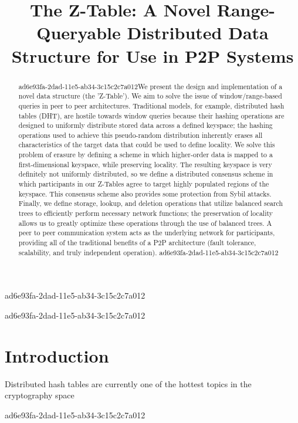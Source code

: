 \documentclass[12pt]{article}
\title{The Z-Table: A Novel Range-Queryable Distributed Data Structure for Use in P2P Systems}
\begin{document}
ad6e93fa-2dad-11e5-ab34-3c15c2c7a012
\maketitle

\begin{abstract}
ad6e93fa-2dad-11e5-ab34-3c15c2c7a012We present the design and implementation of a novel data structure (the 'Z-Table'). We aim to solve the issue of window/range-based queries in peer to peer architectures. Traditional models, for example,  distributed hash tables (DHT), are hostile towards window queries because their hashing operations are designed to uniformly distribute stored data across a defined keyspace; the hashing operations used to achieve this pseudo-random distribution inherently erases all characteristics of the target data that could be used to define locality. We solve this problem of erasure by defining a scheme in which higher-order data is mapped to a first-dimensional keyspace, while preserving locality. The resulting keyspace is very definitely not uniformly distributed, so we define a distributed consensus scheme in which participants in our Z-Tables agree to target highly populated regions of the keyspace. This consensus scheme also provides some protection from Sybil attacks. Finally, we define storage, lookup, and deletion operations that utilize balanced search trees to efficiently perform necessary network functions; the preservation of locality allows us to greatly optimize these operations through the use of balanced trees. A peer to peer communication system acts as the underlying network for participants, providing all of the traditional benefits of a P2P architecture (fault tolerance, scalability, and truly independent operation).
ad6e93fa-2dad-11e5-ab34-3c15c2c7a012\end{abstract}

ad6e93fa-2dad-11e5-ab34-3c15c2c7a012
\newpage
\section{Introduction}
Distributed hash tables are currently one of the hottest topics in the cryptography space~\cite{Stoica:2001dj,Rowstron:2001ea,Ratnasamy:2001wn}

ad6e93fa-2dad-11e5-ab34-3c15c2c7a012\printbibliography
\end{document}
